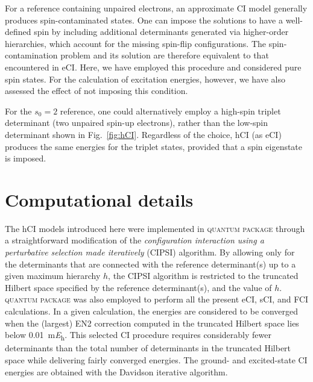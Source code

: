 \documentclass[aip,jcp,reprint,noshowkeys,superscriptaddress]{revtex4-1}
\newcommand{\QP}{\textsc{quantum package}}
\begin{document}
For a reference containing unpaired electrons, an approximate CI model generally produces spin-contaminated states.
One can impose the solutions to have a well-defined spin by including additional determinants generated via higher-order hierarchies, which account for the missing spin-flip configurations. \cite{Chilkuri_2021}
The spin-contamination problem and its solution are therefore equivalent to that encountered in eCI. \cite{Maurice_1996}
Here, we have employed this procedure and considered pure spin states.
For the calculation of excitation energies, however, we have also assessed the effect of not imposing this condition.

For the $s_0 = 2$ reference, one could alternatively employ a high-spin triplet determinant (two unpaired spin-up electrons),
rather than the low-spin determinant shown in Fig.~\ref{fig:hCI}.
Regardless of the choice, hCI (as eCI) produces the same energies for the triplet states, provided that a spin eigenstate is imposed.

\section{Computational details}
\label{sec:compdet}

The hCI models introduced here were implemented in {\QP} \cite{Garniron_2019} through a straightforward modification of the
\textit{configuration interaction using a perturbative selection made iteratively} (CIPSI) algorithm. \cite{Huron_1973,Giner_2013,Giner_2015,Garniron_2018}
By allowing only for the determinants that are connected with the reference determinant(s) up to a given maximum hierarchy $h$,
the CIPSI algorithm is restricted to the truncated Hilbert space specified by the reference determinant(s), and the value of $h$.
{\QP} \cite{Garniron_2019} was also employed to perform all the present eCI, sCI, and FCI calculations.
In a given calculation, the energies are considered to be converged when the (largest) EN2 correction computed in the truncated Hilbert space
lies below \SI{0.01}{\milli\hartree}. \cite{Garniron_2017}
This selected CI procedure requires considerably fewer determinants than the total number of determinants in the truncated Hilbert space
while delivering fairly converged energies.
The ground- and excited-state CI energies are obtained with the Davidson iterative algorithm. \cite{Davidson_1975}
\end{document}
